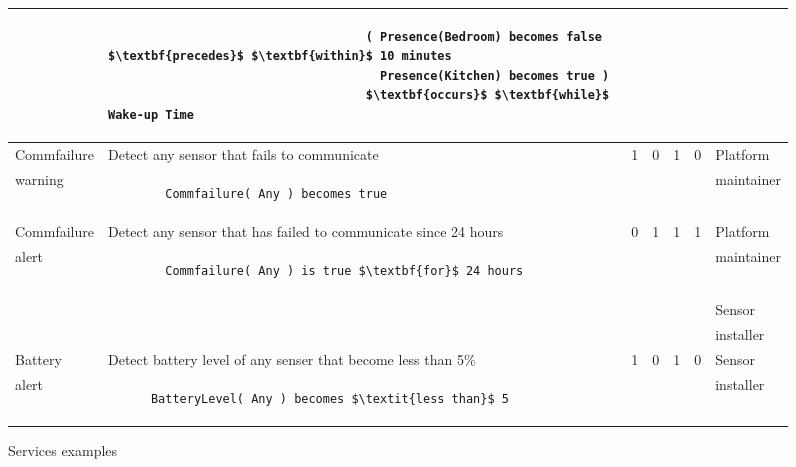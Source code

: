 \begin{figure*}[h]
\begin{tabular}{|l|p{7cm}|c|c|c|c|l|}
                                  & \begin{lstlisting} 
                                    ( Presence(Bedroom) becomes false $\textbf{precedes}$ $\textbf{within}$ 10 minutes
                                      Presence(Kitchen) becomes true )
                                    $\textbf{occurs}$ $\textbf{while}$ Wake-up Time
                                  \end{lstlisting}& & & && \\
    \hline
    Commfailure &\cellcolor{gray!15} Detect any sensor that fails to communicate & \multirow{2}{*}{1} & \multirow{2}{*}{0} & \multirow{2}{*}{1} & \multirow{2}{*}{0} & Platform \\%
      warning& \begin{lstlisting}  
        Commfailure( Any ) becomes true 
        \end{lstlisting}& & & && maintainer \\
    \hline
    Commfailure &\cellcolor{gray!15} Detect any sensor that has failed to communicate since 24 hours & \multirow{4}{*}{0} & \multirow{4}{*}{1} & \multirow{4}{*}{1} & \multirow{4}{*}{1} & Platform\\ %
      alert&  \begin{lstlisting} 
        Commfailure( Any ) is true $\textbf{for}$ 24 hours 
        \end{lstlisting}& & & &&  maintainer \\
                                  & & & & && Sensor \\
                                  & & & & && installer \\
    \hline
    Battery & \cellcolor{gray!15} Detect battery level of any senser that become less than 5\% & \multirow{2}{*}{1} & \multirow{2}{*}{0} & \multirow{2}{*}{1} & \multirow{2}{*}{0} & Sensor\\ %
    alert & \begin{lstlisting}
      BatteryLevel( Any ) becomes $\textit{less than}$ 5 
      \end{lstlisting}& & & && installer\\
    \hline
  \end{tabular}
  \caption{Services examples}
  \label{app_examples}
\end{figure*}
